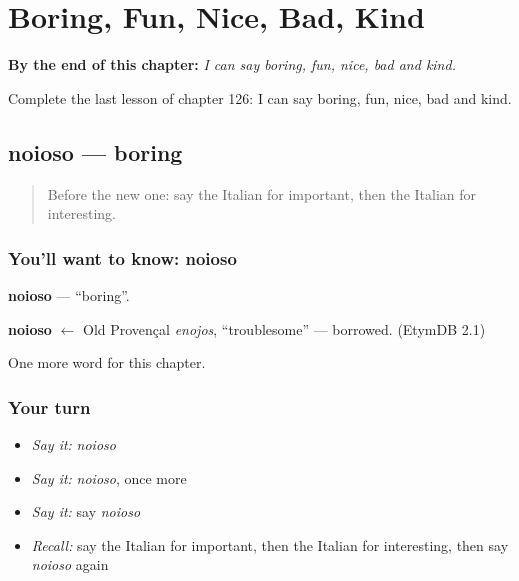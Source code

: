 
\chapter{Boring, Fun, Nice, Bad, Kind}
\label{ch:it-boring-fun-nice-bad-kind}

\begin{chapteropening}
\textbf{By the end of this chapter:} \emph{I can say boring, fun, nice, bad and kind.}

Complete the last lesson of chapter 126: I can say boring, fun, nice, bad and kind.
\end{chapteropening}

\section[noioso]{noioso — boring}

\label{lesson:IT-C126-noioso}



\begin{quote}
Before the new one: say the Italian for important, then the Italian for interesting.
\end{quote}

\subsection*{You'll want to know: noioso}
\textbf{noioso} — \textquotedblleft{}boring\textquotedblright{}.

\begin{cousinweb}
\textbf{noioso} $\leftarrow$ Old Provençal \emph{enojos}, \textquotedblleft{}troublesome\textquotedblright{} — borrowed. (EtymDB 2.1)
\end{cousinweb}

\begin{grammarlens}[title={What you've built}]
One more word for this chapter.
\end{grammarlens}

\subsection*{Your turn}
\begin{itemize}
\raggedright
  \item \emph{Say it:} \emph{noioso}
  \item \emph{Say it:} \emph{noioso}, once more
  \item \emph{Say it:} say \emph{noioso}
  \item \emph{Recall:} say the Italian for important, then the Italian for interesting, then say \emph{noioso} again
\end{itemize}

